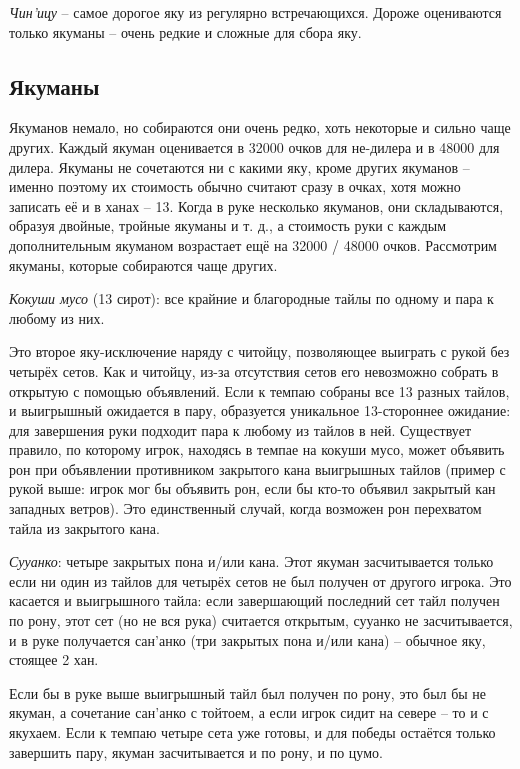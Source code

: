 \noindent{}

\textit{Чин'ицу} – самое дорогое яку из регулярно встречающихся. Дороже оцениваются только якуманы – очень редкие и сложные для сбора яку. 

\subsection{Якуманы}

Якуманов немало, но собираются они очень редко, хоть некоторые и сильно чаще других. Каждый якуман оценивается в 32000 очков для не-дилера и в 48000 для дилера. Якуманы не сочетаются ни с какими яку, кроме других якуманов – именно поэтому их стоимость обычно считают сразу в очках, хотя можно записать её и в ханах – 13. Когда в руке несколько якуманов, они складываются, образуя двойные, тройные якуманы и т. д., а стоимость руки с каждым дополнительным якуманом возрастает ещё на 32000 / 48000 очков. Рассмотрим якуманы, которые собираются чаще других.

\textit{Кокуши мусо} (13 сирот): все крайние и благородные тайлы по одному и пара к любому из них.


Это второе яку-исключение наряду с читойцу, позволяющее выиграть с рукой без четырёх сетов. Как и читойцу, из-за отсутствия сетов его невозможно собрать в открытую с помощью объявлений. Если к темпаю собраны все 13 разных тайлов, и выигрышный ожидается в пару, образуется уникальное 13-стороннее ожидание: для завершения руки подходит пара к любому из тайлов в ней.  Существует правило, по которому игрок, находясь в темпае на кокуши мусо, может объявить рон при объявлении противником закрытого кана выигрышных тайлов (пример с рукой выше: игрок мог бы объявить рон, если бы кто-то объявил закрытый кан западных ветров). Это единственный случай, когда возможен рон перехватом тайла из закрытого кана.

\textit{Сууанко}: четыре закрытых пона и/или кана. Этот якуман засчитывается только если ни один из тайлов для четырёх сетов не был получен от другого игрока. Это касается и выигрышного тайла: если завершающий последний сет тайл получен по рону, этот сет (но не вся рука) считается открытым, сууанко не засчитывается, и в руке получается сан'анко (три закрытых пона и/или кана) – обычное яку, стоящее 2 хан. 


Если бы в руке выше выигрышный тайл был получен по рону, это был бы не якуман, а сочетание сан'анко с тойтоем, а если игрок сидит на севере – то и с якухаем. Если к темпаю четыре сета уже готовы, и для победы остаётся только завершить пару, якуман засчитывается и по рону, и по цумо.

